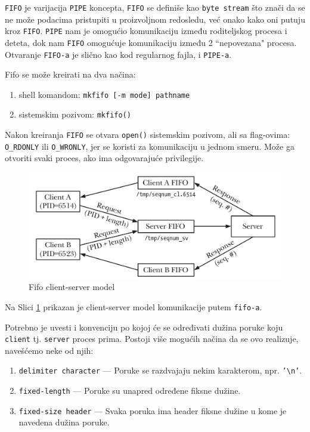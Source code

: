 \documentclass[a4paper, 11pt]{article}
\begin{document}
\texttt{FIFO} je varijacija \texttt{PIPE} koncepta, \texttt{FIFO} se definiše kao \texttt{byte stream} što znači da se ne može podacima pristupiti u proizvoljnom redosledu, već onako kako oni putuju kroz \texttt{FIFO}. \texttt{PIPE} nam je omogućio komunikaciju između roditeljskog procesa i deteta, dok nam \texttt{FIFO} omogućuje komunikaciju između 2 ``nepovezana" procesa. Otvaranje \texttt{FIFO-a} je slično kao kod regularnog fajla, i \texttt{PIPE-a}. 

Fifo se može kreirati na dva načina:
\vspace{-2mm} 
\begin{enumerate}[1)]
	\item{shell komandom: \texttt{mkfifo [-m mode] pathname}}
	\item{sistemskim pozivom: \texttt{mkfifo()}}
\end{enumerate}

Nakon kreiranja \texttt{FIFO} se otvara \texttt{open()} sistemskim pozivom, ali sa flag-ovima: \texttt{O\_RDONLY} ili \texttt{O\_WRONLY}, jer se koristi za komunikaciju u jednom smeru. Može ga otvoriti svaki proces, ako ima odgovarajuće privilegije.

\vspace{1mm} 
\begin{figure}[h]
	\centering
	\includegraphics[width=.7\textwidth]{fifo-client-server.png} %
	\caption{Fifo client-server model}
	\label{fig:fifocs}
\end{figure}

\vspace{2mm} 
Na Slici \ref{fig:fifocs} prikazan je client-server model komunikacije putem \texttt{fifo-a}.

Potrebno je uvesti i konvenciju po kojoj će se određivati dužina poruke koju \texttt{client} tj. \texttt{server} proces prima. Postoji više mogućih načina da se ovo realizuje, navešćemo neke od njih:

\begin{enumerate}[1)]
	\item{\texttt{delimiter character} --- Poruke se razdvajaju nekim karakterom, npr. \texttt{'\textbackslash n'}.}
	\item{\texttt{fixed-length} --- Poruke su unapred određene fiksne dužine.}
	\item{\texttt{fixed-size header} --- Svaka poruka ima header fiksne dužine u kome je navedena dužina poruke.}
\end{enumerate}
\end{document}
